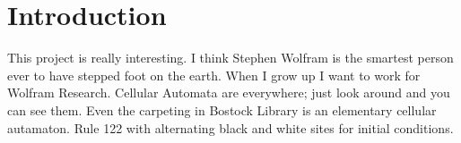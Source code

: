 \section{Introduction}

This project is really interesting.
I think Stephen Wolfram is the smartest person ever to have stepped
foot on the earth.
When I grow up I want to work for Wolfram Research.
Cellular Automata are everywhere; just look around and you can see
them.
Even the carpeting in Bostock Library is an elementary cellular
autamaton.
Rule 122 with alternating black and white sites for initial
conditions.
